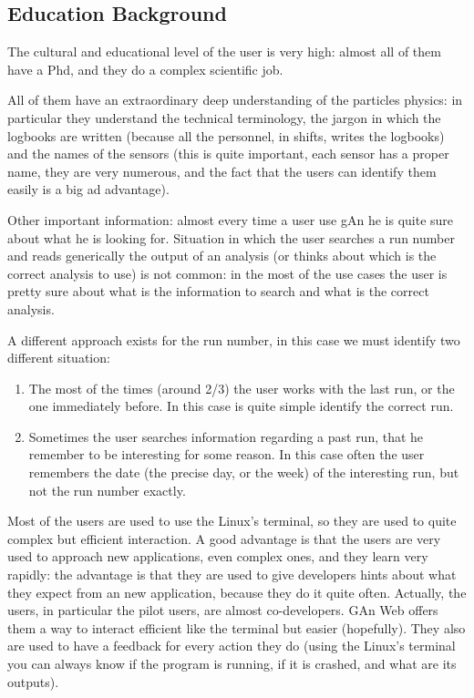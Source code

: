 \subsection{Education Background}
The cultural and educational level of the user is very high: almost all of them have a Phd, and they do a complex scientific job.

All of them have an extraordinary deep understanding of the particles physics: in particular they understand the technical terminology, the jargon in which the logbooks are written (because all the personnel, in shifts, writes the logbooks) and the names of the sensors (this is quite important, each sensor has a proper name, they are very numerous, and the fact that the users can identify them easily is a big ad advantage). 

Other important information: almost every time a user use gAn he is quite sure about what he is looking for. Situation in which the user searches a run number and reads generically the output of an analysis (or thinks about which is the correct analysis to use) is not common: in the most of the use cases the user is pretty sure about what is the information to search and what is the correct analysis. 

A different approach exists for the run number, in this case we must identify two different situation:

\begin{enumerate}

\item The most of the times (around 2/3) the user works with the last run, or the one immediately before. In this case is quite simple identify the correct run.
\item Sometimes the user searches information regarding a past run, that he remember to be interesting for some reason. In this case often the user remembers the date (the precise day, or the week) of the interesting run, but not the run number exactly.

\end{enumerate}

Most of the users are used to use the Linux's terminal, so they are used to quite complex but efficient interaction. A good advantage is that the users are very used to approach new applications, even complex ones, and they learn very rapidly: the advantage is that they are used to give developers hints about what they expect from an new application, because they do it quite often. Actually, the users, in particular the pilot users, are almost co-developers. GAn Web offers them a way to interact efficient like the terminal but easier (hopefully). They also are used to have a feedback for every action they do (using the Linux's terminal you can always know if the program is running, if it is crashed, and what are its outputs).
 
